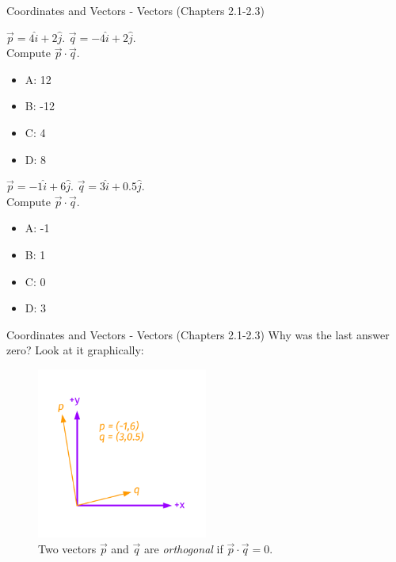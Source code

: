 \documentclass{beamer}
\begin{document}
\begin{frame}{Coordinates and Vectors - Vectors (Chapters 2.1-2.3)}
\small
\begin{minipage}[b]{0.45\linewidth}
$\vec{p} = 4\hat{i}+2\hat{j}$.  $\vec{q} = -4\hat{i}+2\hat{j}$.  \\
Compute $\vec{p} \cdot \vec{q}$.
\vspace{0.2cm}
\begin{itemize}
\item A: 12
\item B: -12
\item C: 4
\item D: 8
\end{itemize}
\end{minipage}
\hspace{0.5cm}
\begin{minipage}[b]{0.45\linewidth}
$\vec{p} = -1\hat{i}+6\hat{j}$.  $\vec{q} = 3\hat{i}+0.5\hat{j}$.  \\
Compute $\vec{p} \cdot \vec{q}$.
\vspace{0.2cm}
\begin{itemize}
\item A: -1
\item B: 1
\item C: 0
\item D: 3
\end{itemize}
\end{minipage}
\end{frame}

\begin{frame}{Coordinates and Vectors - Vectors (Chapters 2.1-2.3)}
Why was the last answer zero?  Look at it graphically:
\begin{figure}
\centering
\includegraphics[width=0.5\textwidth,trim=1cm 1cm 1cm 1cm,clip=true]{figures/Vectors5.pdf}
\caption{\label{fig:twovectors4} Two vectors $\vec{p}$ and $\vec{q}$ are \textit{orthogonal} if $\vec{p} \cdot \vec{q} = 0$.}
\end{figure}
\end{frame}
\end{document}

